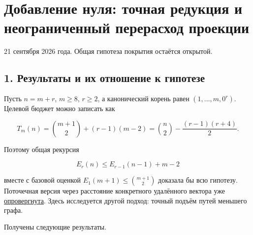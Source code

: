 \documentclass[
  11pt,
  a4paper,
]{article}
\author{}
\date{}
\begin{document}
\hypertarget{ux434ux43eux431ux430ux432ux43bux435ux43dux438ux435-ux43dux443ux43bux44f-ux442ux43eux447ux43dux430ux44f-ux440ux435ux434ux443ux43aux446ux438ux44f-ux438-ux43dux435ux43eux433ux440ux430ux43dux438ux447ux435ux43dux43dux44bux439-ux43fux435ux440ux435ux440ux430ux441ux445ux43eux434-ux43fux440ux43eux435ux43aux446ux438ux438}{%
\section{Добавление нуля: точная редукция и неограниченный перерасход
проекции}\label{ux434ux43eux431ux430ux432ux43bux435ux43dux438ux435-ux43dux443ux43bux44f-ux442ux43eux447ux43dux430ux44f-ux440ux435ux434ux443ux43aux446ux438ux44f-ux438-ux43dux435ux43eux433ux440ux430ux43dux438ux447ux435ux43dux43dux44bux439-ux43fux435ux440ux435ux440ux430ux441ux445ux43eux434-ux43fux440ux43eux435ux43aux446ux438ux438}}

21 сентября 2026 года. Общая гипотеза покрытия остаётся открытой.

\hypertarget{ux440ux435ux437ux443ux43bux44cux442ux430ux442ux44b-ux438-ux438ux445-ux43eux442ux43dux43eux448ux435ux43dux438ux435-ux43a-ux433ux438ux43fux43eux442ux435ux437ux435}{%
\subsection{1. Результаты и их отношение к
гипотезе}\label{ux440ux435ux437ux443ux43bux44cux442ux430ux442ux44b-ux438-ux438ux445-ux43eux442ux43dux43eux448ux435ux43dux438ux435-ux43a-ux433ux438ux43fux43eux442ux435ux437ux435}}

Пусть \(n=m+r\), \(m\ge8\), \(r\ge2\), а канонический корень равен
\((1,\ldots,m,0^r)\). Целевой бюджет можно записать как

\[T_m(n)=\binom{m+1}{2}+(r-1)(m-2)
=\binom n2-\frac{(r-1)(r+4)}2.\]

Поэтому общая рекурсия

\[E_r(n)\le E_{r-1}(n-1)+m-2 \tag{1}\]

вместе с базовой оценкой \(E_1(m+1)\le\binom{m+1}{2}\) доказала бы всю
гипотезу. Поточечная версия через расстояние конкретного удалённого
вектора уже \href{LRX_MULTISET_ZERO_DELETION_AUDIT_RU.md}{опровергнута}.
Здесь исследуется другой подход: точный подъём путей меньшего графа.

Получены следующие результаты.
\end{document}
